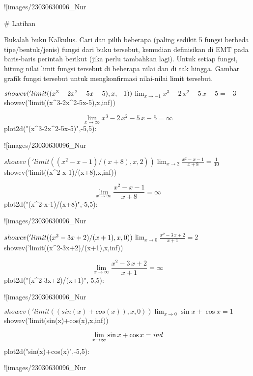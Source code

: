 \documentclass{article}
\begin{document}
![images/23030630096_Nur%

# Latihan

Bukalah buku Kalkulus. Cari dan pilih beberapa (paling sedikit 5 fungsi berbeda
tipe/bentuk/jenis) fungsi dari buku tersebut, kemudian definisikan di EMT pada
baris-baris perintah berikut (jika perlu tambahkan lagi). Untuk setiap fungsi, hitung
nilai limit fungsi tersebut di beberapa nilai dan di tak hingga. Gambar grafik fungsi
tersebut untuk mengkonfirmasi nilai-nilai limit tersebut.


\>$showev('limit((x^3-2\*x^2-5\*x-5),x,-1))


$$\lim_{x\rightarrow -1}{x^3-2\,x^2-5\,x-5}=-3$$\>$showev('limit((x^3-2\*x^2-5\*x-5),x,inf))


$$\lim_{x\rightarrow \infty }{x^3-2\,x^2-5\,x-5}=\infty $$\>plot2d("(x^3-2\*x^2-5\*x-5)",-5,5):


![images/23030630096_Nur%

\>$showev('limit((x^2-x-1)/(x+8),x,2))


$$\lim_{x\rightarrow 2}{\frac{x^2-x-1}{x+8}}=\frac{1}{10}$$\>$showev('limit((x^2-x-1)/(x+8),x,inf))


$$\lim_{x\rightarrow \infty }{\frac{x^2-x-1}{x+8}}=\infty $$\>plot2d("(x^2-x-1)/(x+8)",-5,5):


![images/23030630096_Nur%

\>$showev('limit((x^2-3\*x+2)/(x+1),x,0))


$$\lim_{x\rightarrow 0}{\frac{x^2-3\,x+2}{x+1}}=2$$\>$showev('limit((x^2-3\*x+2)/(x+1),x,inf))


$$\lim_{x\rightarrow \infty }{\frac{x^2-3\,x+2}{x+1}}=\infty $$\>plot2d("(x^2-3\*x+2)/(x+1)",-5,5):


![images/23030630096_Nur%

\>$showev('limit((sin(x)+cos(x)),x,0))


$$\lim_{x\rightarrow 0}{\sin x+\cos x}=1$$\>$showev('limit(sin(x)+cos(x),x,inf))


$$\lim_{x\rightarrow \infty }{\sin x+\cos x}={\it ind}$$\>plot2d("sin(x)+cos(x)",-5,5):


![images/23030630096_Nur%
\end{document}
